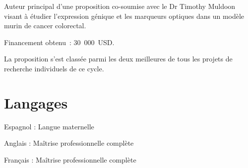 \documentclass[10pt,]{article}
\renewenvironment{itemize}{
  \begin{list}{}{
    \setlength{\leftmargin}{1.5em}
  }
}{
  \end{list}
}
\begin{document}
Auteur principal d'une proposition co-soumise avec le Dr Timothy Muldoon
visant à étudier l'expression génique et les marqueurs optiques dans un
modèle murin de cancer colorectal.

Financement obtenu~: 30~000~USD.

La proposition s'est classée parmi les deux meilleures de tous les
projets de recherche individuels de ce cycle.

\section{Langages}\label{langages}

\begin{itemize}
\item
  Espagnol : Langue maternelle
\item
  Anglais : Maîtrise professionnelle complète
\item
  Français : Maîtrise professionnelle complète
\end{itemize}
\end{document}
